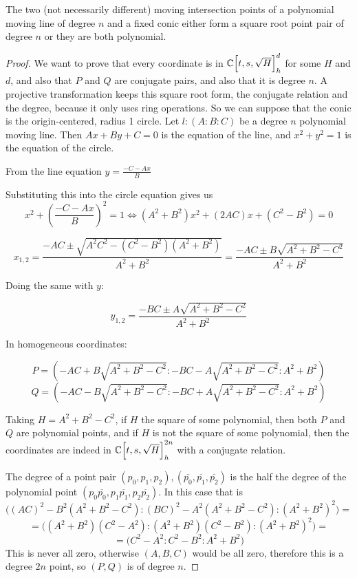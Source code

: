\documentclass[a4paper]{article}
\begin{document}
\begin{theorem}
    The two (not necessarily different) moving intersection points of a polynomial moving line of degree $n$ and a fixed conic either form a square root point pair of degree $n$ or they are both polynomial.

\end{theorem}
\begin{proof}
    We want to prove that every coordinate is in $\mathbb{C}\Bigl[t,s,\sqrt{H}\Bigr]_h^d$ for some $H$ and $d$, and also that $P$ and $Q$ are conjugate pairs, and also that it is degree $n$. A projective transformation keeps this square root form, the conjugate relation and the degree, because it only uses ring operations. So we can suppose that the conic is the origin-centered, radius 1 circle. Let $l:(A:B:C)$ be a degree $n$ polynomial moving line. Then $Ax+By+C=0$ is the equation of the line, and $x^2+y^2=1$ is the equation of the circle.

    From the line equation $y=\frac{-C-Ax}{B}$

    Substituting this into the circle equation gives us $$x^2+\left(\frac{-C-Ax}{B}\right)^2=1 \iff (A^2+B^2)x^2+(2AC)x+(C^2-B^2)=0$$

    $$x_{1,2}=\frac{-AC\pm \sqrt{A^2C^2-(C^2-B^2)(A^2+B^2)}}{A^2+B^2}=\frac{-AC\pm B\sqrt{A^2+B^2-C^2}}{A^2+B^2}$$

    Doing the same with $y$:

    $$y_{1,2}=\frac{-BC\pm A\sqrt{A^2+B^2-C^2}}{A^2+B^2}$$

    In homogeneous coordinates:

    $$P=(-AC + B\sqrt{A^2+B^2-C^2}:-BC - A\sqrt{A^2+B^2-C^2}:A^2+B^2)$$
    $$Q=(-AC - B\sqrt{A^2+B^2-C^2}:-BC + A\sqrt{A^2+B^2-C^2}:A^2+B^2)$$

    Taking $H=A^2+B^2-C^2$, if $H$ the square of some polynomial, then both $P$ and $Q$ are polynomial points, and if $H$ is not the square of some polynomial, then the coordinates are indeed in $\mathbb{C}\Bigl[t,s,\sqrt{H}\Bigr]_h^{2n}$ with a conjugate relation.

    The degree of a point pair $(p_0,p_1,p_2), (\overline{p_0}, \overline{p_1}, \overline{p_2})$ is the half the degree of the polynomial point $(p_0\overline{p_0}, p_1\overline{p_1}, p_2\overline{p_2})$.
    In this case that is
    $$\bigl((AC)^2-B^2(A^2+B^2-C^2):(BC)^2-A^2(A^2+B^2-C^2):(A^2+B^2)^2\bigr)=$$
    $$=\bigl((A^2+B^2)(C^2-A^2):(A^2+B^2)(C^2-B^2):(A^2+B^2)^2\bigr)=$$
    $$=\bigl(C^2-A^2:C^2-B^2:A^2+B^2\bigr)$$
    This is never all zero, otherwise $(A,B,C)$ would be all zero, therefore this is a degree $2n$ point, so $(P,Q)$ is of degree $n$.
\end{proof}
\end{document}
